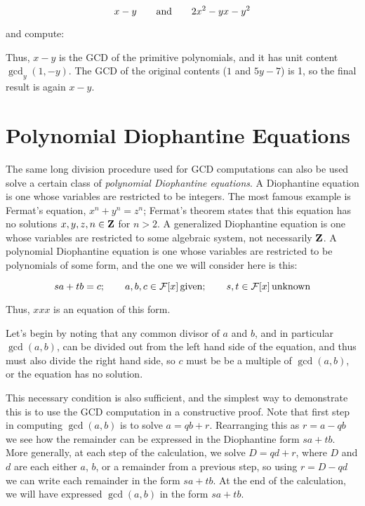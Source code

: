 $$x-y {\rm\qquad and\qquad} 2x^2-yx-y^2$$

and compute:



Thus, $x-y$ is the GCD of the primitive polynomials, and it has unit
content $\gcd_y(1,-y)$.  The GCD of the original contents
($1$ and $5y-7$) is 1, so the final result is again $x-y$.

\vfill\eject

\section{Polynomial Diophantine Equations}

The same long division procedure used for GCD computations can also be
used solve a certain class of {\it polynomial Diophantine equations}.
A Diophantine equation is one whose variables are restricted to be
integers.  The most famous example is Fermat's equation,
$x^n+y^n=z^n$; Fermat's theorem states that this equation has no
solutions $x,y,z,n\in{\bf Z}$ for $n>2$.  A generalized Diophantine
equation is one whose variables are restricted to some algebraic
system, not necessarily ${\bf Z}$.  A polynomial Diophantine equation
is one whose variables are restricted to be polynomials of some form,
and the one we will consider here is this:

\begin{displaymath}
sa+tb=c; \qquad a,b,c\in{\cal F}[x] {\rm\, given}; \qquad
s,t\in{\cal F}[x] {\rm\, unknown}
\end{displaymath}

Thus, $xxx$ is an equation of this form.

Let's begin by noting that any common divisor of $a$ and $b$, and in
particular $\gcd(a,b)$, can be divided out from the left hand side of
the equation, and thus must also divide the right hand side, so $c$
must be be a multiple of $\gcd(a,b)$, or the equation has no solution.

This necessary condition is also sufficient, and the simplest way to
demonstrate this is to use the GCD computation in a constructive
proof.  Note that first step in computing $\gcd(a,b)$ is to solve
$a=qb+r$.  Rearranging this as $r=a-qb$ we see how the remainder can
be expressed in the Diophantine form $sa+tb$.  More generally, at each
step of the calculation, we solve $D=qd+r$, where $D$ and $d$ are each
either $a$, $b$, or a remainder from a previous step, so using
$r=D-qd$ we can write each remainder in the form $sa+tb$.  At the end
of the calculation, we will have expressed $\gcd(a,b)$ in the form
$sa+tb$.

